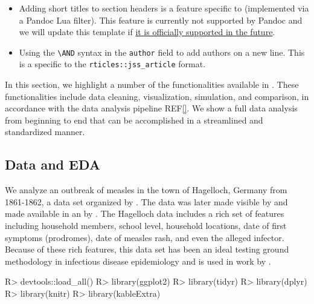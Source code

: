 \documentclass[
]{jss}
\providecommand{\tightlist}{%
  \setlength{\itemsep}{0pt}\setlength{\parskip}{0pt}}
\begin{document}
\begin{itemize}
\tightlist
\item
  Adding short titles to section headers is a feature specific to
   (implemented via a Pandoc Lua filter). This feature is
  currently not supported by Pandoc and we will update this template if
  \href{https://github.com/jgm/pandoc/issues/4409}{it is officially
  supported in the future}.
\item
  Using the \texttt{\textbackslash{}AND} syntax in the \texttt{author}
  field to add authors on a new line. This is a specific to the
  \texttt{rticles::jss\_article} format.
\end{itemize}

In this section, we highlight a number of the functionalities available
in . These functionalities include data cleaning,
visualization, simulation, and comparison, in accordance with the data
analysis pipeline REF\ref{}. We show a full data analysis from beginning
to end that can be accomplished in a streamlined and standardized
manner.

\hypertarget{data-and-eda}{%
\subsection{Data and EDA}\label{data-and-eda}}

We analyze an outbreak of measles in the town of Hagelloch, Germany from
1861-1862, a data set organized by \cite{pfeilsticker1863}. The data was
later made visible by \cite{oesterle1992} and made available in an
 by \cite{surveillance2017}. The Hagelloch data includes a
rich set of features including household members, school level,
household locations, date of first symptoms (prodromes), date of measles
rash, and even the alleged infector. Because of these rich features,
this data set has been an ideal testing ground methodology in infectious
disease epidemiology and is used in work by
\cite{Neal2004,britton2011,groendyke2012,becker2016}.

\begin{CodeChunk}
\begin{CodeInput}
R> devtools::load_all()
R> library(ggplot2)
R> library(tidyr)
R> library(dplyr)
R> library(knitr)
R> library(kableExtra)
\end{CodeInput}
\end{CodeChunk}
\end{document}
